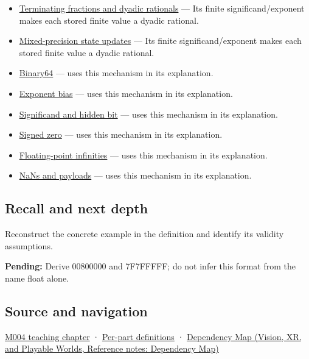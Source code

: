 \begin{itemize}
\item
  \hyperref[appendix-2a2f1b74bdd3]{Terminating fractions and dyadic rationals} --- Its finite significand/exponent makes each stored finite value a dyadic rational.
\item
  \hyperref[appendix-260182e617b7]{Mixed-precision state updates} --- Its finite significand/exponent makes each stored finite value a dyadic rational.
\item
  \hyperref[appendix-5078dfab64e6]{Binary64} --- uses this mechanism in its explanation.
\item
  \hyperref[appendix-2fae058c82e1]{Exponent bias} --- uses this mechanism in its explanation.
\item
  \hyperref[appendix-a24fd710cf67]{Significand and hidden bit} --- uses this mechanism in its explanation.
\item
  \hyperref[appendix-3a048f032c1f]{Signed zero} --- uses this mechanism in its explanation.
\item
  \hyperref[appendix-eb336149c00a]{Floating-point infinities} --- uses this mechanism in its explanation.
\item
  \hyperref[appendix-d6607cc4c235]{NaNs and payloads} --- uses this mechanism in its explanation.
\end{itemize}

\subsection{Recall and next depth}\label{appendix-5057f9ad327f-recall-and-next-depth}

Reconstruct the concrete example in the definition and identify its validity assumptions.

\textbf{Pending:} Derive 00800000 and 7F7FFFFF; do not infer this format from the name float alone.

\subsection{Source and navigation}\label{appendix-5057f9ad327f-source-and-navigation}

\hyperref[01-foundations-i-ch001-a-stretching-ruler-for-real-valued-quantities]{M004 teaching chapter} · \hyperref[appendix-fd090d982a15-m004---parts-61-76]{Per-part definitions} · \href{../07-Vision-XR-and-Playable-Worlds/main.pdf\#nameddest=appendix-4ad47bdd269a}{Dependency Map (Vision, XR, and Playable Worlds, Reference notes: Dependency Map)}
